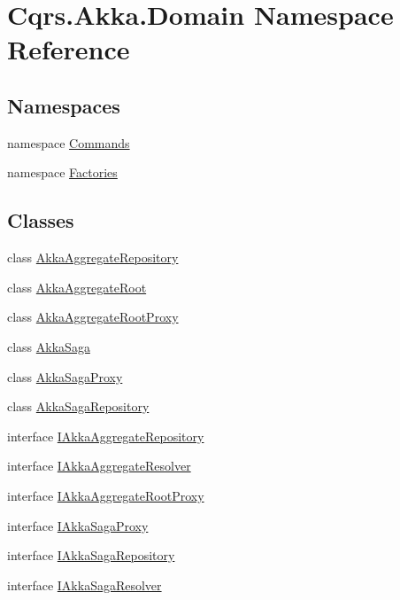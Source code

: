 \hypertarget{namespaceCqrs_1_1Akka_1_1Domain}{}\section{Cqrs.\+Akka.\+Domain Namespace Reference}
\label{namespaceCqrs_1_1Akka_1_1Domain}
\subsection*{Namespaces}
\begin{DoxyCompactItemize}
\item 
namespace \hyperlink{namespaceCqrs_1_1Akka_1_1Domain_1_1Commands}{Commands}
\item 
namespace \hyperlink{namespaceCqrs_1_1Akka_1_1Domain_1_1Factories}{Factories}
\end{DoxyCompactItemize}
\subsection*{Classes}
\begin{DoxyCompactItemize}
\item 
class \hyperlink{classCqrs_1_1Akka_1_1Domain_1_1AkkaAggregateRepository}{Akka\+Aggregate\+Repository}
\item 
class \hyperlink{classCqrs_1_1Akka_1_1Domain_1_1AkkaAggregateRoot}{Akka\+Aggregate\+Root}
\item 
class \hyperlink{classCqrs_1_1Akka_1_1Domain_1_1AkkaAggregateRootProxy}{Akka\+Aggregate\+Root\+Proxy}
\item 
class \hyperlink{classCqrs_1_1Akka_1_1Domain_1_1AkkaSaga}{Akka\+Saga}
\item 
class \hyperlink{classCqrs_1_1Akka_1_1Domain_1_1AkkaSagaProxy}{Akka\+Saga\+Proxy}
\item 
class \hyperlink{classCqrs_1_1Akka_1_1Domain_1_1AkkaSagaRepository}{Akka\+Saga\+Repository}
\item 
interface \hyperlink{interfaceCqrs_1_1Akka_1_1Domain_1_1IAkkaAggregateRepository}{I\+Akka\+Aggregate\+Repository}
\item 
interface \hyperlink{interfaceCqrs_1_1Akka_1_1Domain_1_1IAkkaAggregateResolver}{I\+Akka\+Aggregate\+Resolver}
\item 
interface \hyperlink{interfaceCqrs_1_1Akka_1_1Domain_1_1IAkkaAggregateRootProxy}{I\+Akka\+Aggregate\+Root\+Proxy}
\item 
interface \hyperlink{interfaceCqrs_1_1Akka_1_1Domain_1_1IAkkaSagaProxy}{I\+Akka\+Saga\+Proxy}
\item 
interface \hyperlink{interfaceCqrs_1_1Akka_1_1Domain_1_1IAkkaSagaRepository}{I\+Akka\+Saga\+Repository}
\item 
interface \hyperlink{interfaceCqrs_1_1Akka_1_1Domain_1_1IAkkaSagaResolver}{I\+Akka\+Saga\+Resolver}
\end{DoxyCompactItemize}

